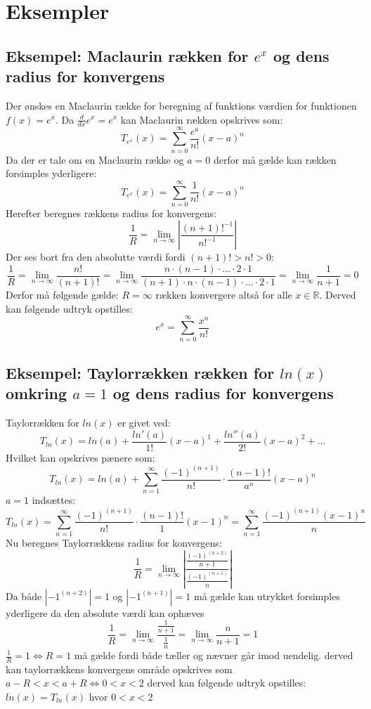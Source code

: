 \section{Eksempler}
\subsection*{\textbf{Eksempel:} Maclaurin rækken for $e^x$ og dens radius for konvergens} 
Der ønskes en Maclaurin række for beregning af funktions værdien for funktionen $f(x) = e^x$.
Da $\frac{d}{dx}e^x = e^x$ kan Maclaurin rækken opskrives som:
\[
    T_{e^x}(x) = \sum^\infty_{n = 0} \frac{e^a}{n!}(x-a)^n
\]
Da der er tale om en Maclaurin række og $a = 0$ derfor må gælde kan rækken forsimples yderligere:
\[
    T_{e^x}(x) = \sum^\infty_{n = 0} \frac{1}{n!}(x-a)^n
\]
Herefter beregnes rækkens radius for konvergens:
\[
    \frac{1}{R} = \lim_{n \rightarrow \infty} \left\lvert \frac{(n + 1)!^{-1}}{n!^{-1}} \right\lvert
\]
Der ses bort fra den absolutte værdi fordi $(n + 1)! > n! > 0$:
\[
    \frac{1}{R}= \lim_{n \rightarrow \infty} \frac{n!}{(n + 1)!} 
    = \lim_{n \rightarrow \infty} \frac{n \cdot (n-1) \cdot \ldots \cdot 2 \cdot 1}{(n + 1) \cdot n \cdot (n-1) \cdot \ldots \cdot 2 \cdot 1}
    = \lim_{n \rightarrow \infty} \frac{1}{n + 1} = 0
\]
Derfor må følgende gælde: $R = \infty$ rækken konvergere altså for alle $x \in \mathbb{R}$.
Derved kan følgende udtryk opstilles:
\[
    e^x = \sum^\infty_{n = 0} \frac{x^n}{n!}  
\]
\subsection*{\textbf{Eksempel:} Taylorrækken rækken for $ln(x)$ omkring $a = 1$ og dens radius for konvergens} %
Taylorrækken for $ln(x)$ er givet ved:
\[
    T_{ln}(x) = ln(a) + \frac{ln'(a)}{1!}(x-a)^1 + \frac{ln''(a)}{2!}(x-a)^2 + \ldots
\]
Hvilket kan opskrives pænere som:
\[
    T_{ln}(x) = ln(a) + \sum^{\infty}_{n = 1} \frac{(-1)^{(n+1)}}{n!} \cdot \frac{(n-1)!}{a^n} (x-a)^{n}
\]
$a = 1$ indsættes:
\[
    T_{ln}(x) = \sum^{\infty}_{n = 1} \frac{(-1)^{(n+1)}}{n!} \cdot \frac{(n-1)!}{1} (x-1)^{n}
    = \sum^{\infty}_{n = 1} \frac{(-1)^{(n+1)}(x-1)^{n}}{n}
\]
Nu beregnes Taylorrækkens radius for konvergens: 
\[
    \frac{1}{R} = \lim_{n \rightarrow \infty} \left\lvert \frac{\frac{(-1)^{(n+2)}}{n+1}}{\frac{(-1)^{(n+1)}}{n}} \right\lvert
\]
Da både $\left\lvert -1^{(n+2)} \right\lvert = 1$ og $\left\lvert-1^{(n + 1)} \right\lvert = 1$ må gælde kan utrykket forsimples yderligere da den absolute værdi kan ophæves
\[
    \frac{1}{R} = \lim_{n \rightarrow \infty} \frac{\frac{1}{n+1}}{\frac{1}{n}} = \lim_{n \rightarrow \infty} \frac{n}{n+1} = 1
\]
$\frac{1}{R} = 1 \Leftrightarrow R = 1$ må gælde fordi både tæller og nævner går imod uendelig. 
derved kan taylorrækkens konvergens område opskrives som $a-R < x < a+R \Leftrightarrow 0 < x < 2$ 
derved kan følgende udtryk opstilles: $ln(x) = T_{ln}(x)$ hvor $ 0 < x < 2$